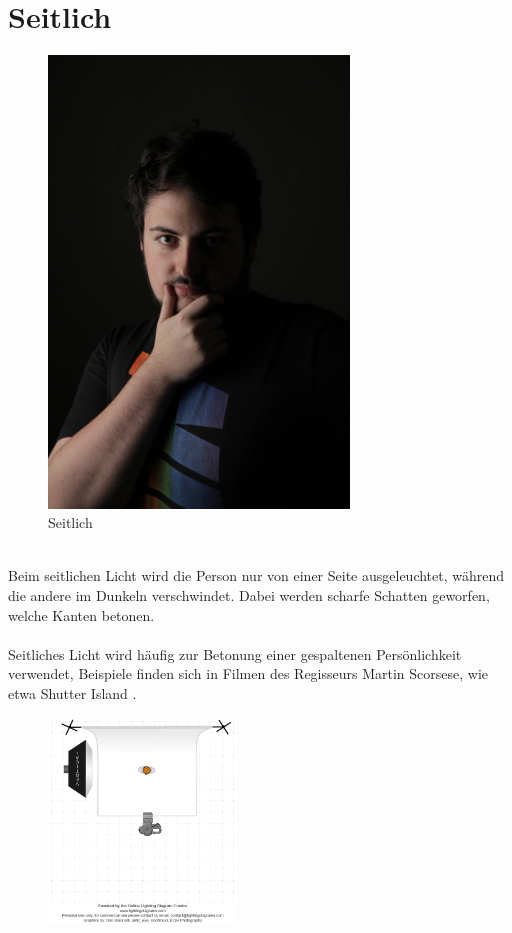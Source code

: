 \documentclass[landscape, notoc]{school}
\begin{document}
\newpage
\section{Seitlich}
\begin{minipage}[t]{.4\textwidth}
\begin{figure}[H]
	\centering
	\includegraphics[height=12cm]{2-seitlich.jpg}
	\caption{Seitlich}
\end{figure}
\end{minipage}
\begin{minipage}[t]{.6\textwidth}~\\
Beim seitlichen Licht wird die Person nur von einer Seite ausgeleuchtet, während die andere im Dunkeln verschwindet. Dabei werden scharfe Schatten geworfen, welche Kanten betonen.
\\\\
Seitliches Licht wird häufig zur Betonung einer gespaltenen Persönlichkeit verwendet, Beispiele finden sich in Filmen des Regisseurs Martin Scorsese, wie etwa Shutter Island \cite{shutter-island}.
\begin{figure}[H]
	\centering
	\includegraphics[width=5cm]{2-seitlich-diagram.png}
\end{figure}
\end{minipage}
\end{document}
